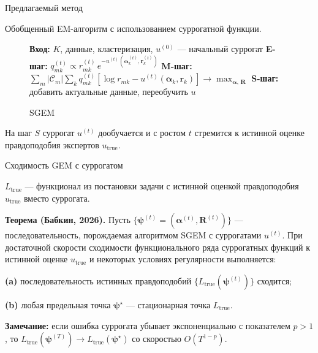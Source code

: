 \documentclass{beamer}
\begin{document}
\begin{frame}{Предлагаемый метод}

 Обобщенный EM-алгоритм с использованием суррогатной функции.

\begin{figure}[h]
  \begin{minipage}{1.\linewidth}
    \begin{algorithm}[H]
    \caption{SGEM}\label{alg:em}
        \begin{algorithmic}
            \State \textbf{Вход:} $K$, данные, кластеризация, $u^{(0)}$ --- начальный суррогат
                \State \textbf{E-шаг:} $q_{mk}^{(t)} \propto r_{mk}^{(t)}\, e^{-u^{(t)}(\boldsymbol{\alpha}_k^{(t)}, \mathbf{r}_k^{(t)})}$
                \State \textbf{M-шаг:} $\sum_m |\mathcal{C}_m| \sum_k q^{(t)}_{mk} \left[\log r_{mk} - u^{(t)}(\boldsymbol{\alpha}_k, \mathbf{r}_k)\right] \to \max_{\boldsymbol{\alpha},\, \mathbf{R}}$
                \State \textbf{S-шаг:} добавить актуальные данные, переобучить $u$
            \EndFor
        \end{algorithmic}
    \end{algorithm}
  \end{minipage}
\end{figure}

\bigskip

На шаг $S$ суррогат $u^{(t)}$ дообучается и с ростом $t$ стремится к истинной оценке правдоподобия экспертов $u_{\mathrm{true}}$.

\end{frame}
\begin{frame}{Сходимость GEM с суррогатом}

    $L_{\mathrm{true}}$ --- функционал из постановки задачи с истинной оценкой правдоподобия $u_{\mathrm{true}}$ вместо суррогата.

    \begin{tcolorbox}[
    colback=gray!10, colframe=gray!50, arc=5mm,
    boxsep=0.5mm, left=3mm, right=3mm, top=2mm, bottom=2mm
    ]
    \textbf{Теорема (Бабкин, 2026).} Пусть $\{\boldsymbol{\psi}^{(t)} = (\boldsymbol{\alpha}^{(t)}, \mathbf{R}^{(t)})\}$ --- последовательность, порождаемая алгоритмом SGEM с суррогатами $u^{(t)}$. При достаточной скорости сходимости функционального ряда суррогатных функций к истинной оценке $u_{\mathrm{true}}$ и некоторых условиях регулярности выполняется:

    \medskip
    \textbf{(a)} последовательность истинных правдоподобий $\{L_{\mathrm{true}}(\boldsymbol{\psi}^{(t)})\}$ сходится;

    \medskip
    \textbf{(b)} любая предельная точка $\boldsymbol{\psi}^{\star}$ --- стационарная точка $L_{\mathrm{true}}$.
    \end{tcolorbox}

    \medskip

\textbf{Замечание:} если ошибка суррогата убывает экспоненциально с показателем $p > 1$, то $L_{\mathrm{true}}(\boldsymbol{\psi}^{(T)}) \to L_{\mathrm{true}}(\boldsymbol{\psi}^{\star})$ со скоростью $O(T^{1-p})$.

\end{frame}
\end{document}
